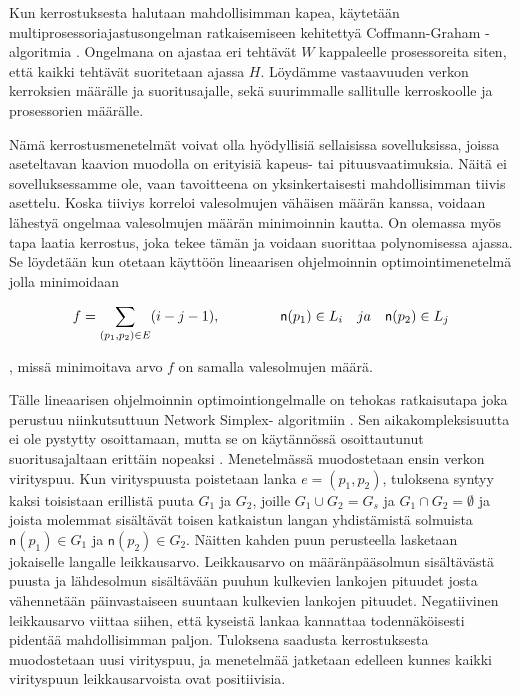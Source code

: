 \documentclass[finnish,12pt]{article}
\begin{document}
Kun kerrostuksesta halutaan mahdollisimman kapea, käytetään multiprosessoriajastusongelman ratkaisemiseen kehitettyä Coffmann-Graham -algoritmia \cite{RefWorks:59}.
Ongelmana on ajastaa eri tehtävät $W$ kappaleelle prosessoreita siten, että kaikki tehtävät suoritetaan ajassa $H$.
Löydämme vastaavuuden verkon kerroksien määrälle ja suoritusajalle, sekä suurimmalle sallitulle kerroskoolle ja prosessorien määrälle.

Nämä kerrostusmenetelmät voivat olla hyödyllisiä sellaisissa sovelluksissa, joissa aseteltavan kaavion muodolla on erityisiä kapeus- tai pituusvaatimuksia.
Näitä ei sovelluksessamme ole, vaan tavoitteena on yksinkertaisesti mahdollisimman tiivis asettelu.
Koska tiiviys korreloi valesolmujen vähäisen määrän kanssa, voidaan lähestyä ongelmaa valesolmujen määrän minimoinnin kautta.
On olemassa myös tapa laatia kerrostus, joka tekee tämän ja voidaan suorittaa polynomisessa ajassa.
Se löydetään kun otetaan käyttöön lineaarisen ohjelmoinnin optimointimenetelmä jolla minimoidaan

$$f=\displaystyle\sum\limits_{(p_1 ,p_2) \in E} (i - j - 1), \hspace{1.5cm} \mathsf{n}(p_1) \in L_i \quad ja \quad \mathsf{n}(p_2) \in L_j$$

, missä minimoitava arvo $f$ on samalla valesolmujen määrä.

Tälle lineaarisen ohjelmoinnin optimointiongelmalle on tehokas ratkaisutapa joka perustuu niinkutsuttuun Network Simplex- algoritmiin \cite{RefWorks:71}.
Sen aikakompleksisuutta ei ole pystytty osoittamaan, mutta se on käytännössä osoittautunut suoritusajaltaan erittäin nopeaksi  \cite{RefWorks:28}.
Menetelmässä muodostetaan ensin verkon virityspuu.
Kun virityspuusta poistetaan lanka $e=(p_1, p_2)$, tuloksena syntyy kaksi toisistaan erillistä puuta $G_1$ ja $G_2$, joille $G_1 \cup G_2 = G_s$ ja $G_1 \cap G_2 = \emptyset$ ja joista molemmat sisältävät toisen katkaistun langan yhdistämistä solmuista $\mathsf{n}(p_1) \in G_1$ ja $\mathsf{n}(p_2) \in G_2$.
Näitten kahden puun perusteella lasketaan jokaiselle langalle leikkausarvo.
Leikkausarvo on määränpääsolmun sisältävästä puusta ja lähdesolmun sisältävään puuhun kulkevien lankojen pituudet
josta vähennetään päinvastaiseen suuntaan kulkevien lankojen pituudet.
Negatiivinen leikkausarvo viittaa siihen, että kyseistä lankaa kannattaa todennäköisesti pidentää mahdollisimman paljon.
Tuloksena saadusta kerrostuksesta muodostetaan uusi virityspuu, ja menetelmää jatketaan edelleen kunnes kaikki virityspuun leikkausarvoista ovat positiivisia.
\end{document}
